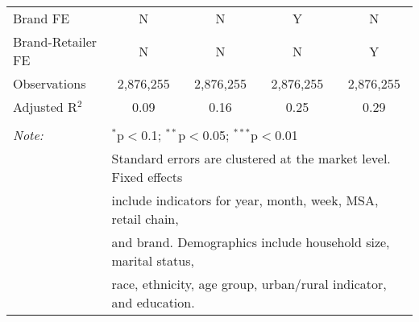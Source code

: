\begin{table}[!htbp]
\begin{tabular}{@{\extracolsep{5pt}}lcccc}
Brand FE & N & N & Y & N \\ 
Brand-Retailer FE & N & N & N & Y \\ 
Observations & 2,876,255 & 2,876,255 & 2,876,255 & 2,876,255 \\ 
Adjusted R$^{2}$ & 0.09 & 0.16 & 0.25 & 0.29 \\ 
\hline 
\hline \\[-1.8ex] 
\textit{Note:}  & \multicolumn{4}{l}{$^{*}$p$<$0.1; $^{**}$p$<$0.05; $^{***}$p$<$0.01} \\ 
 & \multicolumn{4}{l}{Standard errors are clustered at the market level. Fixed effects } \\ 
 & \multicolumn{4}{l}{include indicators for year, month, week, MSA, retail chain, } \\ 
 & \multicolumn{4}{l}{and brand. Demographics include household size, marital status, } \\ 
 & \multicolumn{4}{l}{race, ethnicity, age group, urban/rural indicator, and education.} \\ 
\end{tabular} 
\end{table} 
